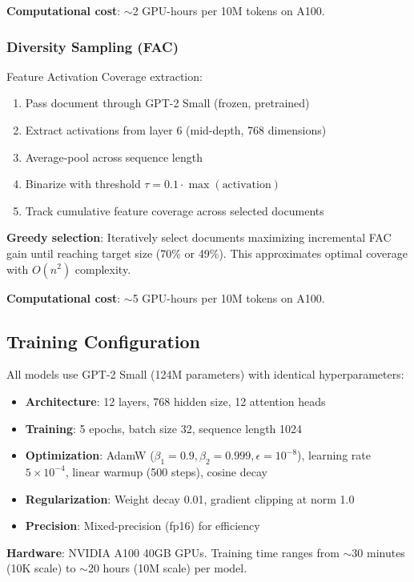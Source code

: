 \textbf{Computational cost}: $\sim$2 GPU-hours per 10M tokens on A100.

\subsubsection{Diversity Sampling (FAC)}

Feature Activation Coverage extraction:

\begin{enumerate}
\item Pass document through GPT-2 Small (frozen, pretrained)
\item Extract activations from layer 6 (mid-depth, 768 dimensions)
\item Average-pool across sequence length
\item Binarize with threshold $\tau=0.1 \cdot \max(\text{activation})$
\item Track cumulative feature coverage across selected documents
\end{enumerate}

\textbf{Greedy selection}: Iteratively select documents maximizing incremental FAC gain until reaching target size (70\% or 49\%). This approximates optimal coverage with $O(n^2)$ complexity.

\textbf{Computational cost}: $\sim$5 GPU-hours per 10M tokens on A100.

\subsection{Training Configuration}

All models use GPT-2 Small (124M parameters) with identical hyperparameters:

\begin{itemize}
\item \textbf{Architecture}: 12 layers, 768 hidden size, 12 attention heads
\item \textbf{Training}: 5 epochs, batch size 32, sequence length 1024
\item \textbf{Optimization}: AdamW ($\beta_1=0.9, \beta_2=0.999, \epsilon=10^{-8}$), learning rate $5 \times 10^{-4}$, linear warmup (500 steps), cosine decay
\item \textbf{Regularization}: Weight decay 0.01, gradient clipping at norm 1.0
\item \textbf{Precision}: Mixed-precision (fp16) for efficiency
\end{itemize}

\textbf{Hardware}: NVIDIA A100 40GB GPUs. Training time ranges from $\sim$30 minutes (10K scale) to $\sim$20 hours (10M scale) per model.


